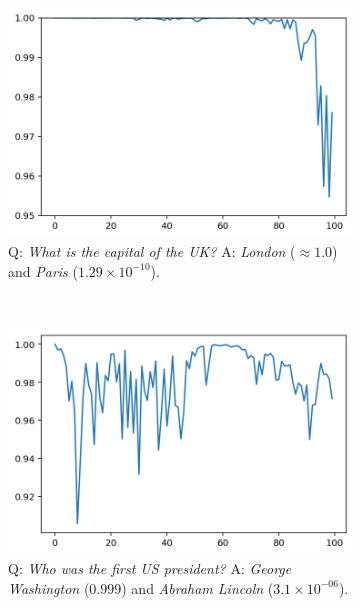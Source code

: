 \documentclass[a4paper]{article}
\theoremstyle{plain}
\theoremstyle{definition}
\theoremstyle{plain}
\begin{document}
\begin{figure}[t]
\begin{center}
    \begin{subfigure}[t]{0.23\linewidth}
      \includegraphics[width=\textwidth]{prob_London.png}
    \caption*{\tiny Q: \emph{What is the capital of the UK?} A: \emph{London} ($\approx 1.0$) and \emph{Paris} ($1.29 \times 10^{-10}$).}
  \end{subfigure}
  ~~
  \begin{subfigure}[t]{0.23\linewidth}
    \includegraphics[width=\textwidth]{prob_GW.png}
    \caption*{\tiny Q: \emph{Who was the first US president?} A: \emph{George Washington} ($0.999$) and \emph{Abraham Lincoln} ($3.1 \times 10^{-06}$).}
  \end{subfigure}
  ~~
  \begin{subfigure}[t]{0.23\linewidth}

\end{subfigure}
\end{center}
\end{figure}
\end{document}
